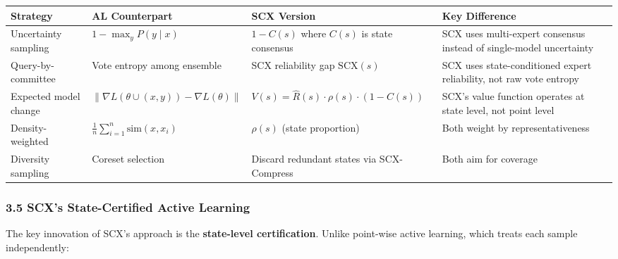 \documentclass[
  12pt,
]{article}
\begin{document}
\begin{longtable}[]{@{}
  >{\raggedright\arraybackslash}p{}
  >{\raggedright\arraybackslash}p{}
  >{\raggedright\arraybackslash}p{}
  >{\raggedright\arraybackslash}p{}@{}}
\toprule\noalign{}
\begin{minipage}[b]{\linewidth}\raggedright
Strategy
\end{minipage} & \begin{minipage}[b]{\linewidth}\raggedright
AL Counterpart
\end{minipage} & \begin{minipage}[b]{\linewidth}\raggedright
SCX Version
\end{minipage} & \begin{minipage}[b]{\linewidth}\raggedright
Key Difference
\end{minipage} \\
\midrule\noalign{}
\endhead
\bottomrule\noalign{}
\endlastfoot
Uncertainty sampling & \(1 - \max_y P(y \mid x)\) & \(1 - C(s)\) where
\(C(s)\) is state consensus & SCX uses multi-expert consensus instead of
single-model uncertainty \\
Query-by-committee & Vote entropy among ensemble & SCX reliability gap
\(\text{SCX}(s)\) & SCX uses state-conditioned expert reliability, not
raw vote entropy \\
Expected model change &
\(\|\nabla L(\theta \cup (x,y)) - \nabla L(\theta)\|\) &
\(V(s) = \hat{R}(s) \cdot \rho(s) \cdot (1 - C(s))\) & SCX's value
function operates at state level, not point level \\
Density-weighted & \(\frac{1}{n}\sum_{i=1}^n \text{sim}(x, x_i)\) &
\(\rho(s)\) (state proportion) & Both weight by representativeness \\
Diversity sampling & Coreset selection & Discard redundant states via
SCX-Compress & Both aim for coverage \\
\end{longtable}

\subsubsection{3.5 SCX's State-Certified Active
Learning}\label{scxs-state-certified-active-learning}

The key innovation of SCX's approach is the \textbf{state-level
certification}. Unlike point-wise active learning, which treats each
sample independently:
\end{document}
